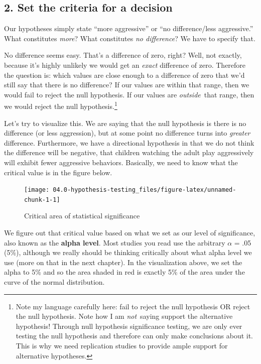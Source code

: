 \documentclass[
]{book}
\begin{document}
\hypertarget{set-the-criteria-for-a-decision}{%
\subsection{2. Set the criteria for a decision}\label{set-the-criteria-for-a-decision}}

Our hypotheses simply state ``more aggressive'' or ``no difference/less aggressive.'' What constitutes \emph{more}? What constitutes \emph{no difference}? We have to specify that.

No difference seems easy. That's a difference of zero, right? Well, not exactly, because it's highly unlikely we would get an \emph{exact} difference of zero. Therefore the question is: which values are close enough to a difference of zero that we'd still say that there is no difference? If our values are within that range, then we would fail to reject the null hypothesis. If our values are \emph{outside}~that range, then we would reject the null hypothesis.\footnote{Note my language carefully here: fail to reject the null hypothesis OR reject the null hypothesis. Note how I am \emph{not}~saying support the alternative hypothesis! Through null hypothesis significance testing, we are only ever testing the null hypothesis and therefore can only make conclusions about it. This is why we need replication studies to provide ample support for alternative hypotheses.}

Let's try to visualize this. We are saying that the null hypothesis is there is no difference (or less aggression), but at some point no difference turns into \emph{greater} difference. Furthermore, we have a directional hypothesis in that we do not think the difference will be negative, that children watching the adult play aggressively will exhibit fewer aggressive behaviors. Basically, we need to know what the critical value is in the figure below.

\begin{figure}

{\centering \texttt{[image: 04.0-hypothesis-testing\_files/figure-latex/unnamed-chunk-1-1]} 

}

\caption{Critical area of statistical significance}\label{fig:unnamed-chunk-1}
\end{figure}

We figure out that critical value based on what we set as our level of significance, also known as the \textbf{alpha level}. Most studies you read use the arbitrary \(\alpha\) = .05 (5\%), although we really should be thinking critically about what alpha level we use (more on that in the next chapter). In the visualization above, we set the alpha to 5\% and so the area shaded in red is exactly 5\% of the area under the curve of the normal distribution.
\end{document}

